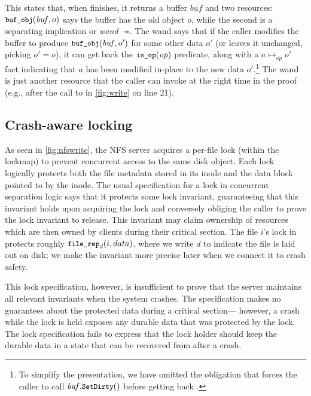 This states that, when  finishes, it returns a buffer $\mathit{buf}$
and two resources: $\cc{buf_obj}(\mathit{buf}, o)$ says the buffer has the old
object $o$, while the second is a separating implication or \emph{wand} $\mathrel{-\!\!\ast}$.
The wand says that if
the caller modifies the buffer to produce $\cc{buf_obj}(\mathit{buf}, o')$ for
some other data $o'$ (or leaves it unchanged, picking $o' = o$), it can get back
the $\cc{is_op}(\mathit{op})$ predicate, along with a
$a \mapsto_{\mathit{op}} o'$ fact indicating that $a$ has been modified in-place
to the new data $o'$.\footnote{To simplify the presentation, we have omitted
the obligation that forces the caller to call $\mathit{buf}.\cc{SetDirty}()$
before getting back .} The wand is just another resource that the
caller can invoke at the right time in the proof (e.g., after the call to
 in \autoref{fig:write} on line 21).

\subsection{Crash-aware locking}
\label{s:design:crashlock}

As seen in \autoref{fig:nfswrite}, the NFS server acquires a per-file lock
(within the lockmap) to prevent concurrent access to the same disk object.
Each lock
logically protects both the file metadata stored in its inode and the data block pointed
to by the inode. The usual specification for a lock
in concurrent separation logic says
that it protects some lock invariant, guaranteeing that this
invariant holds upon acquiring the lock and conversely obliging the caller to
prove the lock invariant to release.
This invariant may claim ownership of resources which are then owned by clients during their critical section.
The file $i$'s lock in \simplenfs protects
roughly $\cc{file_rep}_{d}(i, data)$, where we write $d$ to indicate the file is
laid out on disk; we make the invariant more precise later when we connect it to
crash safety.

This lock specification, however, is insufficient to prove that the \simplenfs server maintains all relevant invariants when the system crashes.
The specification makes no guarantees about the protected data during
a critical section---%
however, a crash while the lock is held exposes any durable data that
was protected by the lock. The lock specification fails to express that the lock
holder should keep the durable data in a state that can be recovered from after a crash.

